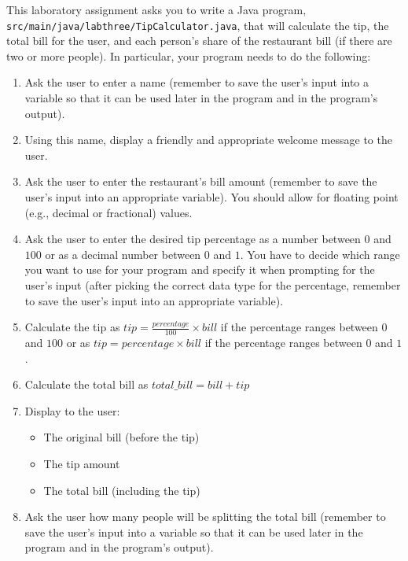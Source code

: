 \documentclass[11pt]{article}
\newcommand{\mainprogramsource}{\lstinline{src/main/java/labthree/TipCalculator.java}}
\begin{document}
This laboratory assignment asks you to write a Java program, \mainprogramsource{}, that will calculate the tip, the
total bill for the user, and each person's share of the restaurant bill (if there are two or more people). In
particular, your program needs to do the following:

\vspace*{-.1in}
\begin{enumerate}

\item Ask the user to enter a name (remember to save the user's input into a variable so that it can be used later in
  the program and in the program's output).

\item Using this name, display a friendly and appropriate welcome message to the user.

\item Ask the user to enter the restaurant's bill amount (remember to save the user's input into an appropriate
  variable). You should allow for floating point (e.g., decimal or fractional) values.

\item Ask the user to enter the desired tip percentage as a number between $0$ and $100$ or as a decimal number between
  $0$ and $1$. You have to decide which range you want to use for your program and specify it when prompting for the
  user's input (after picking the correct data type for the percentage, remember to save the user's input into an
  appropriate variable).

\item Calculate the tip as $tip = \frac{percentage}{100} \times bill$ if the percentage ranges between $0$ and $100$ or
  as $tip = percentage \times bill$ if the percentage ranges between $0$ and $1$.

\item Calculate the total bill as $total\_bill = bill+tip$

\item Display to the user:
    \begin{itemize}
        \item The original bill (before the tip)
        \item The tip amount
        \item The total bill (including the tip)
    \end{itemize}

\item Ask the user how many people will be splitting the total bill (remember to save the user's input into a variable
  so that it can be used later in the program and in the program's output).


\end{enumerate}
\end{document}
